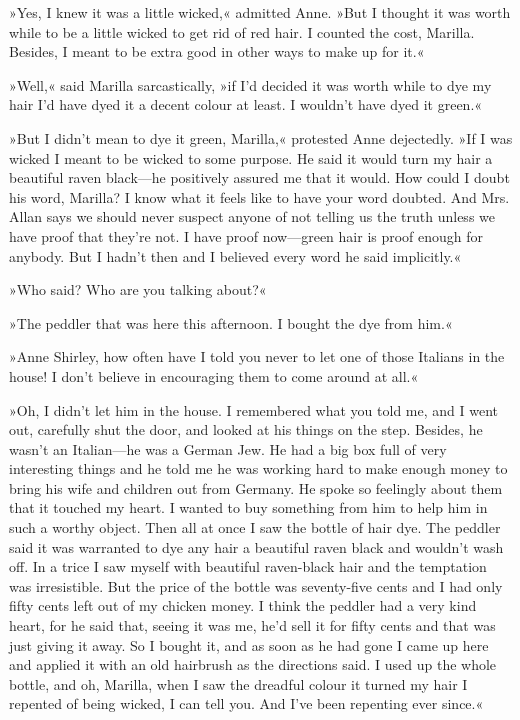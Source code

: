 »Yes, I knew it was a little wicked,« admitted Anne. »But I thought it was worth while to be a little wicked to get rid of red hair. I counted the cost, Marilla. Besides, I meant to be extra good in other ways to make up for it.«

»Well,« said Marilla sarcastically, »if I’d decided it was worth while to dye my hair I’d have dyed it a decent colour at least. I wouldn’t have dyed it green.«

»But I didn’t mean to dye it green, Marilla,« protested Anne dejectedly. »If I was wicked I meant to be wicked to some purpose. He said it would turn my hair a beautiful raven black—he positively assured me that it would. How could I doubt his word, Marilla? I know what it feels like to have your word doubted. And Mrs. Allan says we should never suspect anyone of not telling us the truth unless we have proof that they’re not. I have proof now—green hair is proof enough for anybody. But I hadn’t then and I believed every word he said implicitly.«

»Who said? Who are you talking about?«

»The peddler that was here this afternoon. I bought the dye from him.«

»Anne Shirley, how often have I told you never to let one of those Italians in the house! I don’t believe in encouraging them to come around at all.«

»Oh, I didn’t let him in the house. I remembered what you told me, and I went out, carefully shut the door, and looked at his things on the step. Besides, he wasn’t an Italian—he was a German Jew. He had a big box full of very interesting things and he told me he was working hard to make enough money to bring his wife and children out from Germany. He spoke so feelingly about them that it touched my heart. I wanted to buy something from him to help him in such a worthy object. Then all at once I saw the bottle of hair dye. The peddler said it was warranted to dye any hair a beautiful raven black and wouldn’t wash off. In a trice I saw myself with beautiful raven-black hair and the temptation was irresistible. But the price of the bottle was seventy-five cents and I had only fifty cents left out of my chicken money. I think the peddler had a very kind heart, for he said that, seeing it was me, he’d sell it for fifty cents and that was just giving it away. So I bought it, and as soon as he had gone I came up here and applied it with an old hairbrush as the directions said. I used up the whole bottle, and oh, Marilla, when I saw the dreadful colour it turned my hair I repented of being wicked, I can tell you. And I’ve been repenting ever since.«

